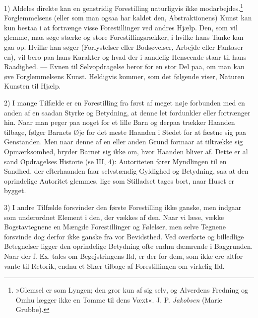 \documentclass[12pt,a4paper,openany]{book}
\newcommand{\opage}[1]{\marginnote{\footnotesize\textit{[#1]}}}
\begin{document}
1) Aldeles direkte kan en genstridig Forestilling naturligvis ikke
modarbejdes.\footnote[2]{»Glemsel er som Lyngen; den gror kun af sig
selv, og Alverdens Fredning og Omhu lægger ikke en Tomme til dens Væxt«.
J. P. \emph{Jakobsen} (Marie Grubbe).} Forglemmelsens (eller som man
ogsaa har kaldet den, Abstraktionens) Kunst kan kun bestaa i at
fortrænge visse Forestillinger ved andres Hjælp. Den, som vil glemme,
maa søge stærke og store Forestillingsrækker, i hvilke
\opage{197}hans Tanke kan gaa op. Hvilke han søger (Forlystelser eller
Bodsøvelser, Arbejde eller Fantaser en), vil bero paa hans Karakter og
hvad der i aandelig Henseende staar til hans Raadighed. --- Evnen til
Selvopdragelse beror for en stor Del paa, om man kan øve Forglemmelsens
Kunst. Heldigvis kommer, som det følgende viser, Naturen Kunsten til
Hjælp.

2) I mange Tilfælde er en Forestilling fra først af meget nøje forbunden
med en anden af en saadan Styrke og Betydning, at denne let fordunkler
eller fortrænger hin. Naar man peger paa noget for et lille Barn og
derpaa trækker Haanden tilbage, følger Barnets Øje for det meste Haanden
i Stedet for at fæstne sig paa Genstanden. Men naar denne af en eller
anden Grund formaar at tiltrække sig Opmærksomhed, bryder Barnet sig
ikke om, hvor Haanden bliver af. Dette er al sand Opdragelses Historie
(se III, 4): Autoriteten fører Myndlingen til en Sandhed, der
efterhaanden faar selvstændig Gyldighed og Betydning, saa at den
oprindelige Autoritet glemmes, lige som Stilladset tages bort, naar
Huset er bygget.

3) I andre Tilfælde forsvinder den første Forestilling ikke ganske, men
indgaar som underordnet Element i den, der vækkes af den. Naar vi læse,
vække Bogstavtegnene en Mængde Forestillinger og Følelser, men selve
Tegnene forsvinde dog derfor ikke ganske fra vor Bevidsthed. Ved
overførte og billedlige Betegnelser ligger den oprindelige Betydning
ofte endnu dæmrende i Baggrunden. Naar der f. Ex. tales om
Begejstringens Ild, er der for dem, som ikke ere altfor vante til
Retorik, endnu et Skær tilbage af Forestillingen om virkelig Ild.
\end{document}
